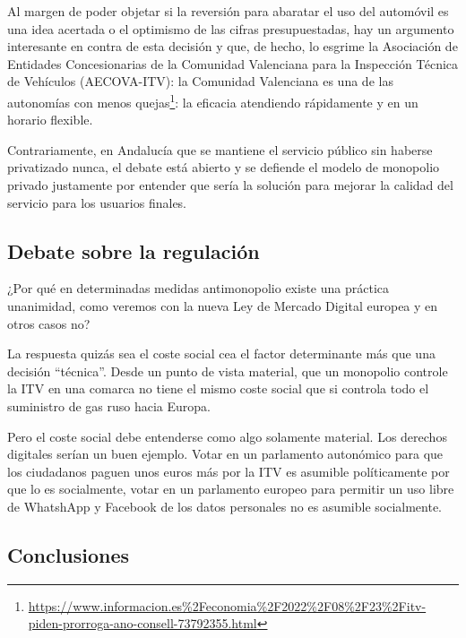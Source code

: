 \documentclass[
]{article}
\begin{document}
Al margen de poder objetar si la reversión para abaratar el uso del
automóvil es una idea acertada o el optimismo de las cifras
presupuestadas, hay un argumento interesante en contra de esta decisión
y que, de hecho, lo esgrime la Asociación de Entidades Concesionarias de
la Comunidad Valenciana para la Inspección Técnica de Vehículos
(AECOVA-ITV): la Comunidad Valenciana es una de las autonomías con menos
quejas\footnote{\url{https://www.informacion.es\%2Feconomia\%2F2022\%2F08\%2F23\%2Fitv-piden-prorroga-ano-consell-73792355.html}}:
la eficacia atendiendo rápidamente y en un horario flexible.

Contrariamente, en Andalucía que se mantiene el servicio público sin
haberse privatizado nunca, el debate está abierto y se defiende el
modelo de monopolio privado justamente por entender que sería la
solución para mejorar la calidad del servicio para los usuarios finales.

\hypertarget{debate-sobre-la-regulaciuxf3n}{%
\subsection*{Debate sobre la
regulación}\label{debate-sobre-la-regulaciuxf3n}}

¿Por qué en determinadas medidas antimonopolio existe una práctica
unanimidad, como veremos con la nueva Ley de Mercado Digital europea y
en otros casos no?

La respuesta quizás sea el coste social cea el factor determinante más
que una decisión ``técnica''. Desde un punto de vista material, que un
monopolio controle la ITV en una comarca no tiene el mismo coste social
que si controla todo el suministro de gas ruso hacia Europa.

Pero el coste social debe entenderse como algo solamente material. Los
derechos digitales serían un buen ejemplo. Votar en un parlamento
autonómico para que los ciudadanos paguen unos euros más por la ITV es
asumible políticamente por que lo es socialmente, votar en un parlamento
europeo para permitir un uso libre de WhatshApp y Facebook de los datos
personales no es asumible socialmente.

\hypertarget{conclusiones}{%
\subsection*{Conclusiones}\label{conclusiones}}
\end{document}
